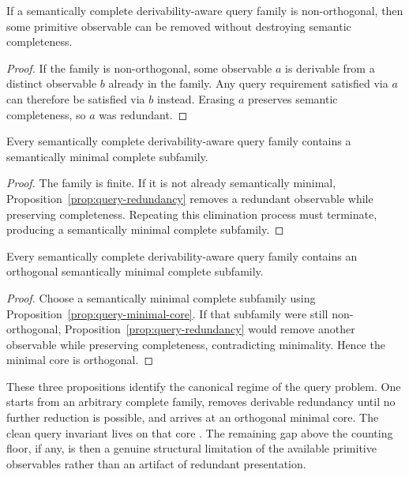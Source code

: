 \begin{proposition}\label{prop:query-redundancy}
If a semantically complete derivability-aware query family is non-orthogonal, then some primitive observable can be removed without destroying semantic completeness.
\end{proposition}

\begin{proof}
If the family is non-orthogonal, some observable $a$ is derivable from a distinct observable $b$ already in the family. Any query requirement satisfied via $a$ can therefore be satisfied via $b$ instead. Erasing $a$ preserves semantic completeness, so $a$ was redundant.
\end{proof}

\begin{proposition}\label{prop:query-minimal-core}
Every semantically complete derivability-aware query family contains a semantically minimal complete subfamily.
\end{proposition}

\begin{proof}
The family is finite. If it is not already semantically minimal, Proposition~\ref{prop:query-redundancy} removes a redundant observable while preserving completeness. Repeating this elimination process must terminate, producing a semantically minimal complete subfamily.
\end{proof}

\begin{proposition}\label{prop:query-orthogonal-core}
Every semantically complete derivability-aware query family contains an orthogonal semantically minimal complete subfamily.
\end{proposition}

\begin{proof}
Choose a semantically minimal complete subfamily using Proposition~\ref{prop:query-minimal-core}. If that subfamily were still non-orthogonal, Proposition~\ref{prop:query-redundancy} would remove another observable while preserving completeness, contradicting minimality. Hence the minimal core is orthogonal.
\end{proof}

These three propositions identify the canonical regime of the query problem. One starts from an arbitrary complete family, removes derivable redundancy until no further reduction is possible, and arrives at an orthogonal minimal core. The clean query invariant lives on that core \cite{Welsh1976}. The remaining gap above the counting floor, if any, is then a genuine structural limitation of the available primitive observables rather than an artifact of redundant presentation.

